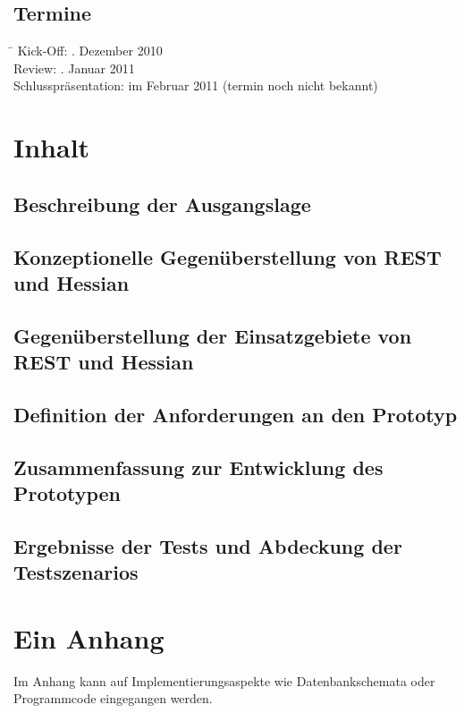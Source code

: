 \documentclass[listof=totoc,bibliography=totoc]{scrreprt}
\begin{document}
  \section{Termine}
  
  \begin{tabbing}
      \hspace*{4cm}\= \kill
    Kick-Off:               . Dezember 2010 \\
    Review:                 . Januar 2011 \\
    Schlusspräsentation:    \> im Februar 2011 (termin noch nicht bekannt)\\
  \end{tabbing}
  
  \chapter{Inhalt}
  
  
  \section{Beschreibung der Ausgangslage}
  \section{Konzeptionelle Gegenüberstellung von REST und Hessian}
  \section{Gegenüberstellung der Einsatzgebiete von REST und Hessian}
  \section{Definition der Anforderungen an den Prototyp}
  \section{Zusammenfassung zur Entwicklung des Prototypen}
  \section{Ergebnisse der Tests und Abdeckung der Testszenarios}
  
  \appendix
  
  \chapter{Ein Anhang}
  
  Im Anhang kann auf Implementierungsaspekte wie Datenbankschemata
  oder Programmcode eingegangen werden.
  
  \listoffigures
  
  \listoftables
  
  
  
\end{document}
